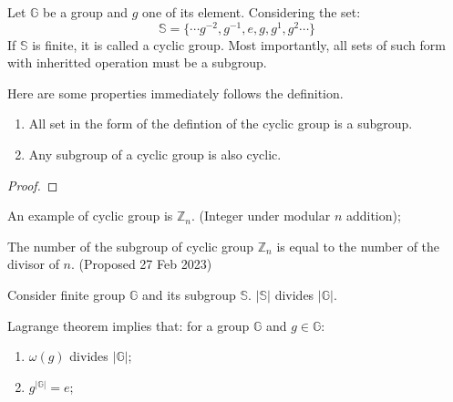 \documentclass[../note.tex]{subfiles}
\begin{document}
\begin{definition}
Let $\mathbb{G}$ be a group and $g$ one of its element. Considering the set:
\[
	\mathbb{S} = \{\cdots g^{-2}, g^{-1}, e, g, g^1, g^2 \cdots\}  
\]
If $\mathbb{S}$ is finite, it is called a cyclic group. Most importantly, all sets of such form with inheritted operation must be a subgroup.
\end{definition}

\begin{theorem}
Here are some properties immediately follows the definition.
\begin{enumerate}
	\item All set in the form of the defintion of the cyclic group is a subgroup.
	\item \label{Cyclic_Inheritance}Any subgroup of a cyclic group is also cyclic.
\end{enumerate}	
\end{theorem}

\begin{proof}
	
\end{proof}

\begin{example}
An example of cyclic group is $\mathbb{Z}_n$. (Integer under modular $n$ addition);
\end{example}

\begin{proposition}
	The number of the subgroup of cyclic group $\mathbb{Z}_n$ is equal to the number of the divisor of $n$. (Proposed 27 Feb 2023)
\end{proposition}

\begin{definition}

\end{definition}

\begin{theorem}
Consider finite group $\mathbb{G}$ and its subgroup $\mathbb{S}$. $|\mathbb{S}|$ divides $|\mathbb{G}|.$	
\end{theorem}

\begin{proposition}
Lagrange theorem implies that:
for a group $\mathbb{G}$ and $g \in \mathbb{G}$:

\begin{enumerate}
	\item $\omega (g)$ divides $|\mathbb{G}|$; 
	\item $g^{|\mathbb{G}|}=e$;
\end{enumerate}
\end{proposition}
\end{document}
